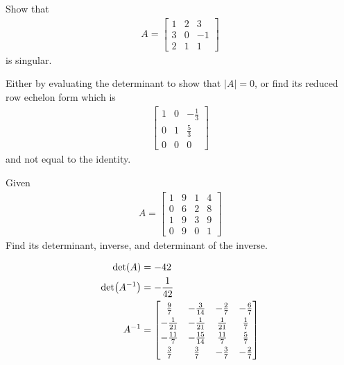 \begin{Exercise}
Show that
\begin{align*}
A = 
\begin{bmatrix}
1 & 2 & 3 \\
3 & 0 & -1 \\
2 & 1 & 1 
\end{bmatrix}
\end{align*}
is singular.
\end{Exercise}
\begin{Answer}
Either by evaluating the determinant to show that $|A| = 0$, or find its reduced row echelon form which is
\begin{align*}
\begin{bmatrix}
1 & 0 & -\frac{1}{3} \\
0 & 1 & \frac{5}{3} \\
0 & 0 & 0
\end{bmatrix}
\end{align*}
and not equal to the identity.
\end{Answer}


\begin{Exercise}
Given
\begin{align*}
A =
\begin{bmatrix}
1 & 9 & 1 & 4\\
0 & 6 & 2 & 8\\
1 & 9 & 3 & 9\\
0 & 9 & 0 & 1
\end{bmatrix}  
\end{align*}
Find its determinant, inverse, and determinant of the inverse. 
\end{Exercise}
\begin{Answer}
\begin{align*}
\det(A) &= -42\\
\det(A^{-1}) &= -\frac{1}{42}\\
A^{-1} &= 
\def\arraystretch{1.25}
\begin{bmatrix}
\frac{9}{7} & -\frac{3}{14} & -\frac{2}{7} & -\frac{6}{7} \\
-\frac{1}{21} & -\frac{1}{21} & \frac{1}{21} & \frac{1}{7} \\
-\frac{11}{7} & -\frac{15}{14} & \frac{11}{7} & \frac{5}{7} \\
\frac{3}{7} & \frac{3}{7} & -\frac{3}{7} & -\frac{2}{7}
\end{bmatrix}
\end{align*}
\end{Answer}

